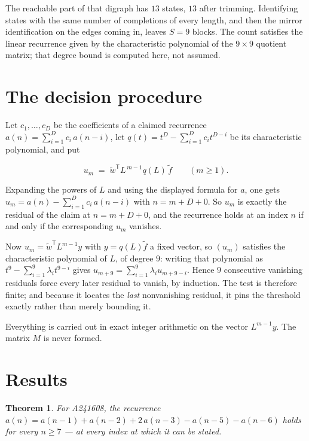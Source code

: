 \documentclass[11pt]{article}
\newtheorem{theorem}{Theorem}
\theoremstyle{definition}
\begin{document}
The reachable part of that digraph has $13$ states, $13$ after trimming. Identifying states with the same number of completions of every length, and then the mirror identification on the edges coming in, leaves $S = 9$ blocks. The count satisfies the linear recurrence given by the characteristic polynomial of the $9\times9$ quotient matrix; that degree bound is computed here, not assumed.

\section{The decision procedure}

Let $c_1,\dots,c_D$ be the coefficients of a claimed recurrence $a(n) = \sum_{i=1}^{D} c_i\,a(n-i)$, let $q(t) = t^{D} - \sum_{i=1}^{D} c_i t^{D-i}$ be its characteristic polynomial, and put

\[u_m \;=\; \tilde w^{\mathsf T} L^{\,m-1} q(L)\,\tilde f \qquad (m \ge 1).\]

Expanding the powers of $L$ and using the displayed formula for $a$, one gets $u_m = a(n) - \sum_{i=1}^{D} c_i\,a(n-i)$ with $n = m + D + 0$. So $u_m$ is exactly the residual of the claim at $n = m + D + 0$, and the recurrence holds at an index $n$ if and only if the corresponding $u_m$ vanishes.

Now $u_m = \tilde w^{\mathsf T} L^{m-1} y$ with $y = q(L)\tilde f$ a fixed vector, so $(u_m)$ satisfies the characteristic polynomial of $L$, of degree $9$: writing that polynomial as $t^{9} - \sum_{i=1}^{9} \lambda_i t^{9-i}$ gives $u_{m+9} = \sum_{i=1}^{9} \lambda_i u_{m+9-i}$. Hence $9$ consecutive vanishing residuals force every later residual to vanish, by induction. The test is therefore finite; and because it locates the {\itshape last} nonvanishing residual, it pins the threshold exactly rather than merely bounding it.

Everything is carried out in exact integer arithmetic on the vector $L^{m-1}y$. The matrix $M$ is never formed.

\section{Results}

\begin{theorem} For A241608, the recurrence $a(n) = a(n-1) + a(n-2) + 2\,a(n-3) - a(n-5) - a(n-6)$ holds for every $n \ge 7$ --- at every index at which it can be stated.\end{theorem}
\end{document}
